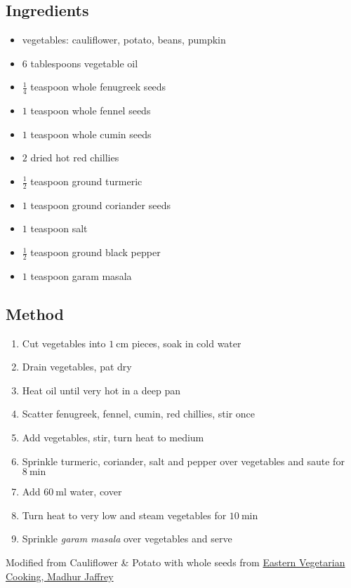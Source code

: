 \documentclass[11pt,a4paper]{article}
\begin{document}
\subsection*{Ingredients}

\begin{multicols}{2}

\begin{itemize}
  \item vegetables: cauliflower, potato, beans, pumpkin
  \item $ 6 $ tablespoons vegetable oil
  \item $ \frac{1}{4} $ teaspoon whole fenugreek seeds
  \item $ 1 $ teaspoon whole fennel seeds
  \item $ 1 $ teaspoon whole cumin seeds
  \item $ 2 $ dried hot red chillies
\end{itemize}

\columnbreak{}

\begin{itemize}
  \item $ \frac{1}{2} $ teaspoon ground turmeric
  \item $ 1 $ teaspoon ground coriander seeds
  \item $ 1 $ teaspoon salt
  \item $ \frac{1}{2} $ teaspoon ground black pepper
  \item $ 1 $ teaspoon garam masala
\end{itemize}

\end{multicols}

\medskip

\subsection*{Method}

\begin{enumerate}
  \item Cut vegetables into $ \qty{1}{\centi\metre} $ pieces, soak in cold water
  \item Drain vegetables, pat dry
  \item Heat oil until very hot in a deep pan
  \item Scatter fenugreek, fennel, cumin, red chillies, stir once
  \item Add vegetables, stir, turn heat to medium
  \item Sprinkle turmeric, coriander, salt and pepper over vegetables and saute for $ \qty{8}{\minute} $
  \item Add $ \qty{60}{\milli\litre} $ water, cover
  \item Turn heat to very low and steam vegetables for $ \qty{10}{\minute} $
  \item Sprinkle \textit{garam masala} over vegetables and serve
\end{enumerate}

Modified from Cauliflower \& Potato with whole seeds from \href{https://www.goodreads.com/book/show/1855233.Eastern_Vegetarian_Cooking}{Eastern Vegetarian Cooking, Madhur Jaffrey}
\end{document}
